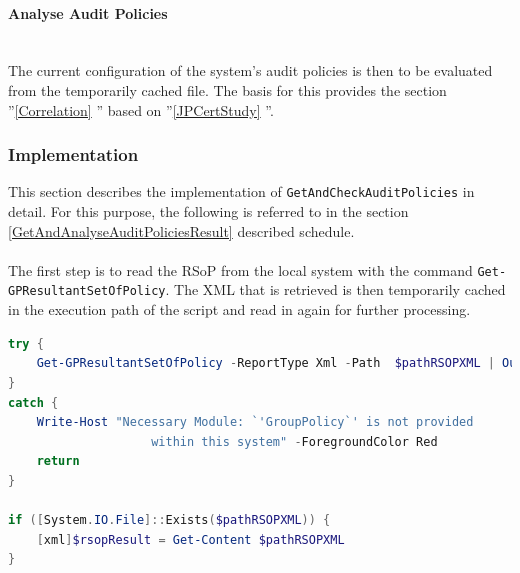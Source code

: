 \paragraph{Analyse Audit Policies} \ \\
The current configuration of the system's audit policies is then to be evaluated from the temporarily cached file. The basis for this provides the section ''\ref{Correlation} '' based on ''\ref{JPCertStudy} ''.

\clearpage 

\subsubsection{Implementation}
This section describes the implementation of \lstinline|GetAndCheckAuditPolicies| in detail. For this purpose, the following is referred to in the section \ref{GetAndAnalyseAuditPoliciesResult}  described schedule.
\\\\
The first step is to read the RSoP from the local system with the command \lstinline|Get-GPResultantSetOfPolicy|. The XML that is retrieved is then temporarily cached in the execution path of the script and read in again for further processing.
\begin{lstlisting}[caption=Get-GPResultantSetOfPolicy, language=PowerShell]
try {
    Get-GPResultantSetOfPolicy -ReportType Xml -Path  $pathRSOPXML | Out-Null
}
catch {
    Write-Host "Necessary Module: `'GroupPolicy`' is not provided 
                    within this system" -ForegroundColor Red
    return
}

if ([System.IO.File]::Exists($pathRSOPXML)) {
    [xml]$rsopResult = Get-Content $pathRSOPXML
}
\end{lstlisting}
\vspace{1cm}
